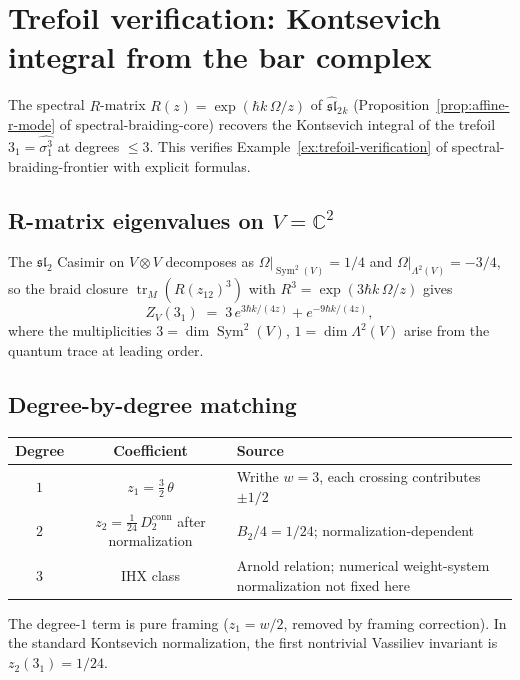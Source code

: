 \documentclass[11pt]{article}
\newcommand{\fsl}{\mathfrak{sl}}
\newcommand{\C}{\mathbb{C}}
\DeclareMathOperator{\Sym}{Sym}
\begin{document}
\section{Trefoil verification: Kontsevich integral from the bar complex}
\label{sec:trefoil-bar-verification}

The spectral $R$-matrix $R(z) = \exp(\hbar k\,\Omega/z)$ of
$\widehat{\fsl}_2{}_k$
(Proposition~\ref{prop:affine-r-mode} of spectral-braiding-core)
recovers the Kontsevich integral of the trefoil $3_1 =
\widehat{\sigma_1^3}$ at degrees $\le 3$.  This verifies
Example~\ref{ex:trefoil-verification} of spectral-braiding-frontier
with explicit formulas.

\subsection*{R-matrix eigenvalues on $V = \C^2$}

The $\fsl_2$ Casimir on $V \otimes V$ decomposes as
$\Omega|_{\Sym^2(V)} = 1/4$ and
$\Omega|_{\Lambda^2(V)} = -3/4$, so the braid closure
$\operatorname{tr}_{M}(R(z_{12})^3)$ with
$R^3 = \exp(3\hbar k\,\Omega/z)$
gives
\[
  Z_V(3_1)
  \;=\;
  3\,e^{3\hbar k/(4z)} + e^{-9\hbar k/(4z)},
\]
where the multiplicities $3 = \dim\Sym^2(V)$,
$1 = \dim\Lambda^2(V)$ arise from the quantum trace at leading
order.

\subsection*{Degree-by-degree matching}

\begin{center}
\renewcommand{\arraystretch}{1.3}
\begin{tabular}{ccl}
\textbf{Degree} & \textbf{Coefficient} & \textbf{Source} \\
\hline
$1$ & $z_1 = \tfrac{3}{2}\,\theta$ &
  Writhe $w = 3$, each crossing contributes $\pm 1/2$ \\
$2$ & $z_2 = \tfrac{1}{24}\,D_2^{\mathrm{conn}}$ after normalization &
  $B_2/4 = 1/24$; normalization-dependent \\
$3$ & IHX class &
  Arnold relation; numerical weight-system normalization not fixed here
\end{tabular}
\end{center}

\noindent
The degree-$1$ term is pure framing ($z_1 = w/2$, removed by
framing correction).  In the standard Kontsevich normalization,
the first nontrivial Vassiliev invariant is $z_2(3_1) = 1/24$.
\end{document}
